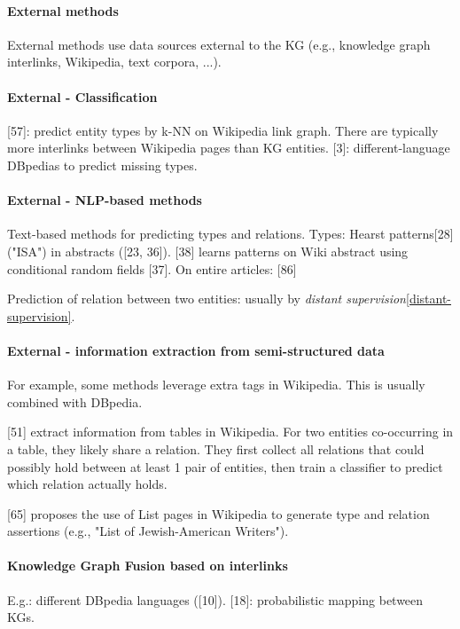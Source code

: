 \paragraph{External methods}
External methods use data sources external to the KG (e.g., knowledge graph
interlinks, Wikipedia, text corpora, ...).

\paragraph{External - Classification}
[57]: predict entity types by k-NN on Wikipedia link graph.
There are typically more interlinks between Wikipedia pages than KG entities.
[3]: different-language DBpedias to predict missing types.

\paragraph{External - NLP-based methods}
Text-based methods for predicting types and relations.
Types: Hearst patterns[28] ("ISA") in abstracts ([23, 36]).
[38] learns patterns on Wiki abstract using conditional random fields [37].
On entire articles: [86]

Prediction of relation between two entities: usually by \textit{distant
supervision}\ref{distant-supervision}.

\paragraph{External - information extraction from semi-structured data}
For example, some methods leverage extra tags in Wikipedia.
This is usually combined with DBpedia.

[51] extract information from tables in Wikipedia.
For two entities co-occurring in a table, they likely share a relation.
They first collect all relations that could possibly hold between at least 1
pair of entities, then train a classifier to predict which relation actually
holds.

[65] proposes the use of List pages in Wikipedia to generate type and relation
assertions (e.g., "List of Jewish-American Writers").

\paragraph{Knowledge Graph Fusion based on interlinks}
E.g.: different DBpedia languages ([10]). [18]: probabilistic mapping between
KGs.

